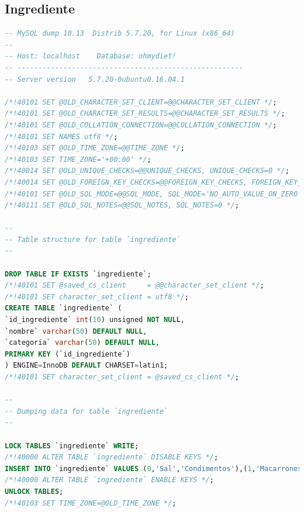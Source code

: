 \documentclass[12pt,letterpaper]{article}
\begin{document}
\subsection{Ingrediente}
\begin{lstlisting}[language=sql]
-- MySQL dump 10.13  Distrib 5.7.20, for Linux (x86_64)
--
-- Host: localhost    Database: ohmydiet!
-- ------------------------------------------------------
-- Server version	5.7.20-0ubuntu0.16.04.1

/*!40101 SET @OLD_CHARACTER_SET_CLIENT=@@CHARACTER_SET_CLIENT */;
/*!40101 SET @OLD_CHARACTER_SET_RESULTS=@@CHARACTER_SET_RESULTS */;
/*!40101 SET @OLD_COLLATION_CONNECTION=@@COLLATION_CONNECTION */;
/*!40101 SET NAMES utf8 */;
/*!40103 SET @OLD_TIME_ZONE=@@TIME_ZONE */;
/*!40103 SET TIME_ZONE='+00:00' */;
/*!40014 SET @OLD_UNIQUE_CHECKS=@@UNIQUE_CHECKS, UNIQUE_CHECKS=0 */;
/*!40014 SET @OLD_FOREIGN_KEY_CHECKS=@@FOREIGN_KEY_CHECKS, FOREIGN_KEY_CHECKS=0 */;
/*!40101 SET @OLD_SQL_MODE=@@SQL_MODE, SQL_MODE='NO_AUTO_VALUE_ON_ZERO' */;
/*!40111 SET @OLD_SQL_NOTES=@@SQL_NOTES, SQL_NOTES=0 */;

--
-- Table structure for table `ingrediente`
--

DROP TABLE IF EXISTS `ingrediente`;
/*!40101 SET @saved_cs_client     = @@character_set_client */;
/*!40101 SET character_set_client = utf8 */;
CREATE TABLE `ingrediente` (
`id_ingrediente` int(10) unsigned NOT NULL,
`nombre` varchar(50) DEFAULT NULL,
`categoria` varchar(50) DEFAULT NULL,
PRIMARY KEY (`id_ingrediente`)
) ENGINE=InnoDB DEFAULT CHARSET=latin1;
/*!40101 SET character_set_client = @saved_cs_client */;

--
-- Dumping data for table `ingrediente`
--

LOCK TABLES `ingrediente` WRITE;
/*!40000 ALTER TABLE `ingrediente` DISABLE KEYS */;
INSERT INTO `ingrediente` VALUES (0,'Sal','Condimentos'),(1,'Macarrones','Pasta'),(2,'Azucar blanco','Edulcorantes'),(3,'Pimienta','Condimentos'),(4,'Leche liquida','Productos lacteos'),(5,'Nata','Productos lacteos'),(6,'Ajo','Frutas y hortalizas'),(7,'Cebolla','Frutas y hortalizas'),(8,'Pimiento','Frutas y hortalizas'),(9,'Tomate','Frutas y hortalizas'),(10,'Pollo','Productos carnicos'),(11,'Ternera','Productos carnicos'),(12,'Cerdo','Productos carnicos'),(13,'Pavo','Productos carnicos'),(14,'Dorada','Productos pesqueros'),(15,'Pulpo','Productos pesqueros'),(16,'Tortas','Productos de panaderia'),(17,'Pan leudado','Productos de panaderia'),(18,'Pan integral','Productos de panaderia'),(19,'Mantequilla','Grasas y aceites'),(20,'Aceite de oliva','Grasas y aceites'),(21,'Aceite de girasol','Grasas y aceites'),(22,'Miel','Edulcorantes'),(23,'Lactosa','Edulcorantes'),(24,'Azucar moreno','Edulcorantes'),(25,'Queso rallado','Lacteos'),(26,'Lechuga','Frutas y hortalizas'),(27,'Habas','Frutas y hortalizas'),(28,'Limon','Frutas y hortalizas'),(29,'Oregano','Condimentos'),(30,'Arroz','Cereales'),(31,'Calamares','Productos pesqueros'),(32,'Gambas','Productos pesqueros');
/*!40000 ALTER TABLE `ingrediente` ENABLE KEYS */;
UNLOCK TABLES;
/*!40103 SET TIME_ZONE=@OLD_TIME_ZONE */;


\end{lstlisting}
\end{document}
